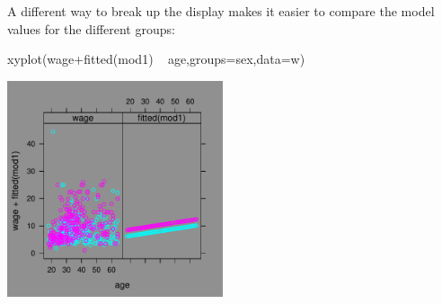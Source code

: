 A different way to break up the display makes it easier to compare the
model values for the different groups:

\begin{Schunk}
\begin{Sinput}
 xyplot(wage+fitted(mod1) ~ age,groups=sex,data=w)
\end{Sinput}
\end{Schunk}


\centerline{\includegraphics[width=2.5in]{Figures/fig-gmf5}}


